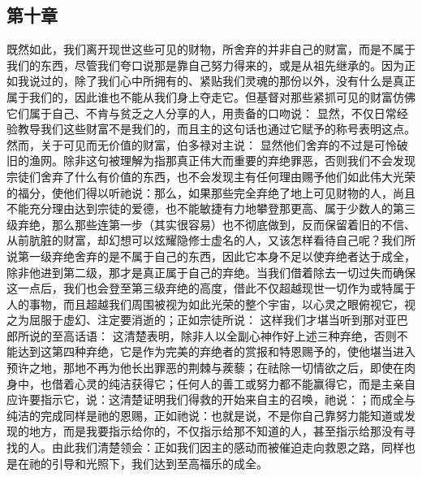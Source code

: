 
\subsection{第十章}

\par

既然如此，我们离开现世这些可见的财物，所舍弃的并非自己的财富，而是不属于我们的东西，尽管我们夸口说那是靠自己努力得来的，或是从祖先继承的。因为正如我说过的，除了我们心中所拥有的、紧贴我们灵魂的那份以外，没有什么是真正属于我们的，因此谁也不能从我们身上夺走它。但基督对那些紧抓可见的财富仿佛它们属于自己、不肯与贫乏之人分享的人，用责备的口吻说： 显然，不仅日常经验教导我们这些财富不是我们的，而且主的这句话也通过它赋予的称号表明这点。然而，关于可见而无价值的财富，伯多禄对主说： 显然他们舍弃的不过是可怜破旧的渔网。除非这句被理解为指那真正伟大而重要的弃绝罪恶，否则我们不会发现宗徒们舍弃了什么有价值的东西，也不会发现主有任何理由赐予他们如此伟大光荣的福分，使他们得以听祂说：那么，如果那些完全弃绝了地上可见财物的人，尚且不能充分理由达到宗徒的爱德，也不能敏捷有力地攀登那更高、属于少数人的第三级弃绝，那么那些连第一步（其实很容易）也不彻底做到，反而保留着旧的不信、从前肮脏的财富，却幻想可以炫耀隐修士虚名的人，又该怎样看待自己呢？我们所说第一级弃绝舍弃的是不属于自己的东西，因此它本身不足以使弃绝者达于成全，除非他进到第二级，那才是真正属于自己的弃绝。当我们借着除去一切过失而确保这一点后，我们也会登至第三级弃绝的高度，借此不仅超越现世一切作为或特属于人的事物，而且超越我们周围被视为如此光荣的整个宇宙，以心灵之眼俯视它，视之为屈服于虚幻、注定要消逝的；正如宗徒所说： 这样我们才堪当听到那对亚巴郎所说的至高话语： 这清楚表明，除非人以全副心神作好上述三种弃绝，否则不能达到这第四种弃绝，它是作为完美的弃绝者的赏报和特恩赐予的，使他堪当进入预许之地，那地不再为他长出罪恶的荆棘与蒺藜；在祛除一切情欲之后，即使在肉身中，也借着心灵的纯洁获得它；任何人的善工或努力都不能赢得它，而是主亲自应许要指示它，说：这清楚证明我们得救的开始来自主的召唤，祂说：；而成全与纯洁的完成同样是祂的恩赐，正如祂说：也就是说，不是你自己靠努力能知道或发现的地方，而是我要指示给你的，不仅指示给那不知道的人，甚至指示给那没有寻找的人。由此我们清楚领会：正如我们因主的感动而被催迫走向救恩之路，同样也是在祂的引导和光照下，我们达到至高福乐的成全。\par

